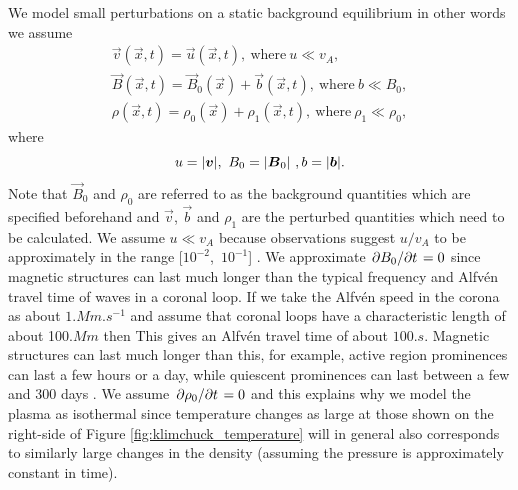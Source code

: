 We model small perturbations on a static background equilibrium in other words we assume
\begin{gather}
    \label{eq:linear_assumotion_v}
    \vec{v}(\vec{x},t) = \vec{u}(\vec{x},t),\ \text{where}\ u\ll v_A,\\
    \label{eq:linear_assumotion_b}
    \vec{B}(\vec{x},t) = \vec{B}_0(\vec{x}) + \vec{b}(\vec{x},t),\ \text{where}\ b\ll B_0, \\
    \label{eq:linear_assumotion_rho}
    \rho(\vec{x},t) = \rho_0(\vec{x}) + \rho_1(\vec{x},t),\ \text{where}\ \rho_1\ll \rho_0,
\end{gather}
where
\[u = \abs{\vec{v}},\ B_0=\abs{\vec{B}_0}\ ,b=\abs{\vec{b}}.\] Note that $\vec{B}_0$ and $\rho_0$ are referred to as the background quantities which are specified beforehand and $\vec{v}$, $\vec{b}$ and $\rho_1$ are the perturbed quantities which need to be calculated.
We assume $u\ll v_A$ because observations suggest $u / v_A$ to be approximately in the range [$10^{-2}$,\ $10^{-1}$] \citep{McIntosh2011,McIntosh2012}. We approximate $\pdv*{B_0}{t}=0$ since magnetic structures can last much longer than the typical frequency and Alfv\'en travel time of waves in a coronal loop. If we take the Alfv\'en speed in the corona as about $1\si{.Mm.s^{-1}}$ \citep{McIntosh2011} and assume that coronal loops have a characteristic length of about 100$\si{.Mm}$ \citep{O'Neill2005} then This gives an Alfv\'en travel time of about $100\si{.s}$. Magnetic structures can last much longer than this, for example, active region prominences can last a few hours or a day, while quiescent prominences can last between a few and 300 days \citep{Priest2014}. We assume $\pdv*{\rho_0}{t}=0$ and this explains why we model the plasma as isothermal since temperature changes as large at those shown on the right-side of Figure \ref{fig:klimchuck_temperature} will in general also corresponds to similarly large changes in the density (assuming the pressure is approximately constant in time).
